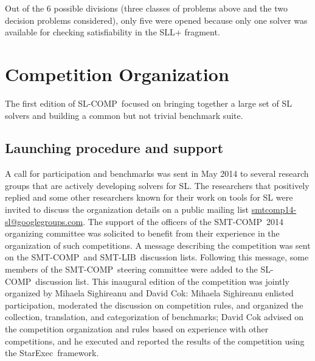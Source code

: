 \documentclass[twoside,11pt]{article}
\newcommand{\SLL}{\textsc{SLL}}
\newcommand{\smtlib}{\textsf{SMT-LIB}}
\newcommand{\smtcomp}{\textsf{SMT-COMP}}
\newcommand{\slcomp}{\textsf{SL-COMP}}
\newcommand{\starexec}{\textsf{StarExec}}
\begin{document}
\noindent
Out of the 6 possible divisions (three classes of problems above and the two decision problems considered), 
only five were opened because only one solver was available for checking satisfiability in the \SLL+ fragment.


\section{Competition Organization}

The first edition of \slcomp\ focused on %
bringing together a large set of SL solvers and
building a common but not trivial benchmark suite. 

\subsection{Launching procedure and support}
A call for participation and benchmarks was sent
in May 2014 %
to several research groups 
that are actively developing solvers for SL.
The researchers that positively replied and some other researchers known for their work on tools for SL were invited to discuss the organization details on a public mailing list \url{smtcomp14-sl@googlegroups.com}.
The support of the officers of the \smtcomp\ 2014 organizing committee was solicited to benefit from their experience in the organization of such competitions.
%
A message describing the competition was sent on the \smtcomp\ and \smtlib\ discussion lists. Following this message, some members of the \smtcomp\ steering committee were added to the \slcomp\ discussion list. 
This inaugural edition of the competition was jointly organized by Mihaela Sighireanu and David Cok:
Mihaela Sighireanu enlisted participation, moderated the discussion on competition rules, and organized the 
collection, translation, and categorization of benchmarks; 
David Cok advised on the competition organization and rules based on experience with other competitions, and he executed and reported the results of the competition using the \starexec\ framework.


\end{document}
